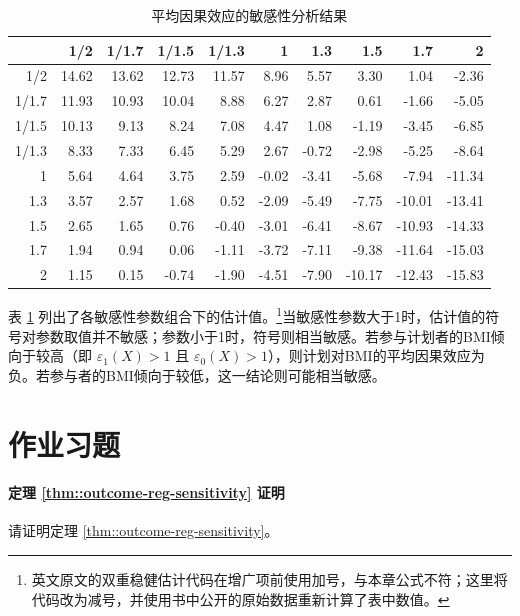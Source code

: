 \begin{table}[ht]
\centering
\caption{平均因果效应的敏感性分析结果}\label{table::sensitivity-ACE}
\begin{tabular}{rrrrrrrrrr}
  \hline
 & 1/2 & 1/1.7 & 1/1.5 & 1/1.3 & 1 & 1.3 & 1.5 & 1.7 & 2 \\ 
  \hline
  1/2 & 14.62 & 13.62 & 12.73 & 11.57 & 8.96 & 5.57 & 3.30 & 1.04 & -2.36 \\
  1/1.7 & 11.93 & 10.93 & 10.04 & 8.88 & 6.27 & 2.87 & 0.61 & -1.66 & -5.05 \\
  1/1.5 & 10.13 & 9.13 & 8.24 & 7.08 & 4.47 & 1.08 & -1.19 & -3.45 & -6.85 \\
  1/1.3 & 8.33 & 7.33 & 6.45 & 5.29 & 2.67 & -0.72 & -2.98 & -5.25 & -8.64 \\
  1 & 5.64 & 4.64 & 3.75 & 2.59 & -0.02 & -3.41 & -5.68 & -7.94 & -11.34 \\
  1.3 & 3.57 & 2.57 & 1.68 & 0.52 & -2.09 & -5.49 & -7.75 & -10.01 & -13.41 \\
  1.5 & 2.65 & 1.65 & 0.76 & -0.40 & -3.01 & -6.41 & -8.67 & -10.93 & -14.33 \\
  1.7 & 1.94 & 0.94 & 0.06 & -1.11 & -3.72 & -7.11 & -9.38 & -11.64 & -15.03 \\
  2 & 1.15 & 0.15 & -0.74 & -1.90 & -4.51 & -7.90 & -10.17 & -12.43 & -15.83 \\
   \hline
\end{tabular}
\end{table}


表 \ref{table::sensitivity-ACE} 列出了各敏感性参数组合下的估计值。\footnote{英文原文的双重稳健估计代码在增广项前使用加号，与本章公式不符；这里将代码改为减号，并使用书中公开的原始数据重新计算了表中数值。}当敏感性参数大于1时，估计值的符号对参数取值并不敏感；参数小于1时，符号则相当敏感。若参与计划者的BMI倾向于较高（即 $\varepsilon_1(X) >1$ 且 $ \varepsilon_0(X) > 1$），则计划对BMI的平均因果效应为负。若参与者的BMI倾向于较低，这一结论则可能相当敏感。



\section{作业习题}


\paragraph{定理 \ref{thm::outcome-reg-sensitivity} 证明}\label{hw::proof-theorem-1-sa}

请证明定理 \ref{thm::outcome-reg-sensitivity}。 

